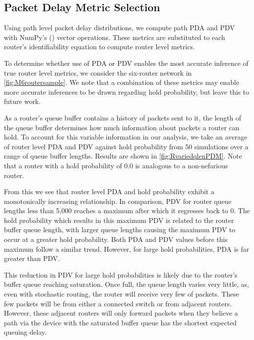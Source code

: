 \subsection{Packet Delay Metric Selection}
\label{ssec:MPDMseclection}
Using path level packet delay distributions, we compute path PDA and PDV with NumPy's (\cite{harris_array_2020}) vector operations. These metrics are substituted to each router's identifiability equation to compute router level metrics.\par
To determine whether use of PDA or PDV enables the most accurate inference of true router level metrics, we consider the six-router network in \cref{fig:M6routersample}. We note that a combination of these metrics may enable more accurate inferences to be drawn regarding hold probability, but leave this to future work.\par
As a router's queue buffer contains a history of packets sent to it, the length of the queue buffer determines how much information about packets a router can hold. To account for this variable information in our analysis, we take an average of router level PDA and PDV against hold probability from 50 simulations over a range of queue buffer lengths. Results are shown in \cref{fig:RvariedqlenPDM}. Note that a router with a hold probability of 0.0 is analogous to a non-nefarious router.\par
From this we see that router level PDA and hold probability exhibit a monotonically increasing relationship. In comparison, PDV for router queue lengths less than 5,000 reaches a maximum  after which it regresses back to 0. The hold probability which results in this maximum PDV is related to the router buffer queue length, with larger queue lengths causing the maximum PDV to occur at a greater hold probability. Both PDA and PDV values before this maximum follow a similar trend. However, for large hold probabilities, PDA is far greater than PDV.\par
This reduction in PDV for large hold probabilities is likely due to the router's buffer queue reaching saturation. Once full, the queue length varies very little, as, even with stochastic routing, the router will receive very few of packets. These few packets will be from either a connected switch or from adjacent routers. However, these adjacent routers will only forward packets when they believe a path via the device with the saturated buffer queue has the shortest expected queuing delay.\par
